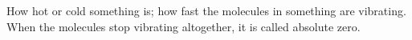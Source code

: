 How hot or cold something is; how fast the molecules in something
are vibrating. When the molecules stop vibrating altogether,
it is called absolute zero.